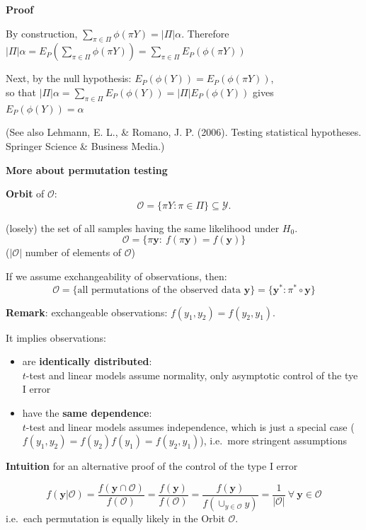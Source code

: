 \documentclass[
]{article}
\providecommand{\tightlist}{%
  \setlength{\itemsep}{0pt}\setlength{\parskip}{0pt}}
\begin{document}
\textbf{Proof}

By construction, \(\sum_{\pi\in \Pi} \phi(\pi Y)=|\Pi|\alpha\).
Therefore
\(|\Pi|\alpha= E_P(\sum_{\pi\in\Pi}\phi(\pi Y))= \sum_{\pi\in\Pi}E_P(\phi(\pi Y))\)

Next, by the null hypothesis: \(E_P(\phi(Y))=E_P(\phi(\pi Y))\),\\
so that \(|\Pi|\alpha= \sum_{\pi\in\Pi}E_P(\phi(Y))=|\Pi|E_P(\phi(Y))\)
gives\\
\(E_P(\phi(Y))=\alpha\)

(See also Lehmann, E. L., \& Romano, J. P. (2006). Testing statistical
hypotheses. Springer Science \& Business Media.)

\textbf{More about permutation testing}

\textbf{Orbit} of \(\mathcal{O}\):
\[\mathcal{O}=\{\pi Y : \pi \in \Pi\} \subseteq \mathcal{Y}.\]

(losely) the set of all samples having the same likelihood under
\(H_0\).\\
\[\mathcal{O}=\{\pi \mathbf{y}:\ f(\pi \mathbf{y})=f(\mathbf{y}) \}\]
(\(|\mathcal{O}|\) number of elements of \(\mathcal{O}\))

If we assume exchangeability of observations, then:
\[\mathcal{O}=\{\textrm{all permutations of the observed data }\mathbf{y}\} = \{\mathbf{y}^*:\pi^*\circ\mathbf{y}\}\]

\textbf{Remark}: exchangeable observations: \(f(y_1,y_2)=f(y_2,y_1)\).

It implies observations:

\begin{itemize}
\tightlist
\item
  are \textbf{identically distributed}:\\
  \(t\)-test and linear models assume normality, only asymptotic control
  of the tye I error\\
\item
  have the \textbf{same dependence}:\\
  \(t\)-test and linear models assumes independence, which is just a
  special case (\(f(y_1,y_2)=f(y_2)f(y_1)=f(y_2,y_1)\)), i.e.~more
  stringent assumptions
\end{itemize}

\textbf{Intuition} for an alternative proof of the control of the type I
error

\[f(\mathbf{y}|\mathcal{O})=\frac{f(\mathbf{y}\cap\mathcal{O})}{f(\mathcal{O})}=
\frac{f(\mathbf{y})}{f(\mathcal{O})}=
\frac{f(\mathbf{y})}{f(\cup_{y\in\mathcal{O}}y)}=\frac{1}{|\mathcal{O}|}\ \forall\ \mathbf{y}\in \mathcal{O}\]
i.e.~each permutation is equally likely in the Orbit \(\mathcal{O}\).
\end{document}
